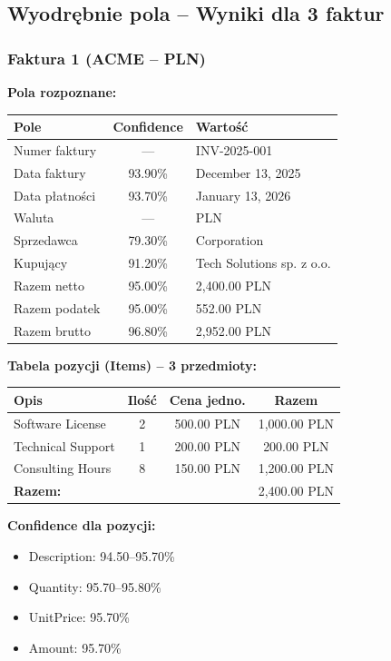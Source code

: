 \subsection{Wyodrębnie pola – Wyniki dla 3 faktur}

\subsubsection{Faktura 1 (ACME – PLN)}

\textbf{Pola rozpoznane:}

\begin{center}
	\begin{tabular}{|l|c|l|}
		\hline
		\textbf{Pole} & \textbf{Confidence} & \textbf{Wartość} \\
		\hline
		Numer faktury & — & INV-2025-001 \\
		Data faktury & 93.90\% & December 13, 2025 \\
		Data płatności & 93.70\% & January 13, 2026 \\
		Waluta & — & PLN \\
		Sprzedawca & 79.30\% & Corporation \\
		Kupujący & 91.20\% & Tech Solutions sp. z o.o. \\
		Razem netto & 95.00\% & 2,400.00 PLN \\
		Razem podatek & 95.00\% & 552.00 PLN \\
		Razem brutto & 96.80\% & 2,952.00 PLN \\
		\hline
	\end{tabular}
\end{center}

\textbf{Tabela pozycji (Items) – 3 przedmioty:}

\begin{center}
	\begin{tabular}{|l|c|c|c|}
		\hline
		\textbf{Opis} & \textbf{Ilość} & \textbf{Cena jedno.} & \textbf{Razem} \\
		\hline
		Software License & 2 & 500.00 PLN & 1,000.00 PLN \\
		Technical Support & 1 & 200.00 PLN & 200.00 PLN \\
		Consulting Hours & 8 & 150.00 PLN & 1,200.00 PLN \\
		\hline
		\multicolumn{3}{|l|}{\textbf{Razem:}} & 2,400.00 PLN \\
		\hline
	\end{tabular}
\end{center}

\textbf{Confidence dla pozycji:}
\begin{itemize}
	\item Description: 94.50–95.70\%
	\item Quantity: 95.70–95.80\%
	\item UnitPrice: 95.70\%
	\item Amount: 95.70\%
\end{itemize}

